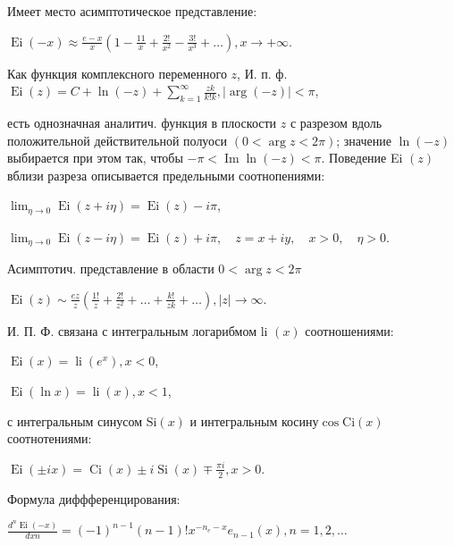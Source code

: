 \documentclass[10pt]{article}
\begin{document}
Имеет место асимптотическое представление:



$\operatorname{Ei}(-x) \approx \frac{e-x}{x}\left(1-\frac{11}{x}+\frac{2 !}{x^{2}}-\frac{3 !}{x^{3}}+\ldots\right), x \rightarrow+\infty$.



Как функция комплексного переменного $z$, И. п. ф. $\operatorname{Ei}(z)=C+\ln (-z)+\sum_{k=1}^{\infty} \frac{z k}{k ! k},|\arg (-z)|<\pi$,



есть однозначная аналитич. функция в плоскости $z$ с разрезом вдоль положительной действительной полуоси $(0<\arg z<2 \pi)$; значение $\ln (-z)$ выбирается при этом так, чтобы $-\pi<\operatorname{Im} \ln (-z)<\pi$. Поведение Ei $(z)$ вблизи разреза описывается предельными соотнопениями:



$\lim _{\eta \rightarrow 0} \operatorname{Ei}(z+i \eta)=\operatorname{Ei}(z)-i \pi$,



$\lim _{\eta \rightarrow 0} \operatorname{Ei}(z-i \eta)=\operatorname{Ei}(z)+i \pi, \quad z=x+i y, \quad x>0, \quad \eta>0$.



Асимптотич. представление в области $0<\arg z<2 \pi$



$\operatorname{Ei}(z) \sim \frac{e z}{z}\left(\frac{1 !}{z}+\frac{2 !}{z^{2}}+\ldots+\frac{k !}{z k}+\ldots\right),|z| \rightarrow \infty$.



И. П. Ф. связана с интегральным логарибмом li $(x)$ соотношениями:



$\operatorname{Ei}(x)=\operatorname{li}\left(e^{x}\right), x<0$,



$\operatorname{Ei}(\ln x)=\operatorname{li}(x), x<1$,



с интегральным синусом $\mathrm{Si}(x)$ и интегральным косину$\cos \mathrm{Ci}(x)$ соотнотениями:



$\operatorname{Ei}( \pm i x)=\operatorname{Ci}(x) \pm i \operatorname{Si}(x) \mp \frac{\pi i}{2}, x>0$.



Формула диффференцирования:



$\frac{d^{n} \operatorname{Ei}(-x)}{d x n}=(-1)^{n-1}(n-1) ! x^{-n_{e}-x} e_{n-1}(x), n=1,2, \ldots$
\end{document}
